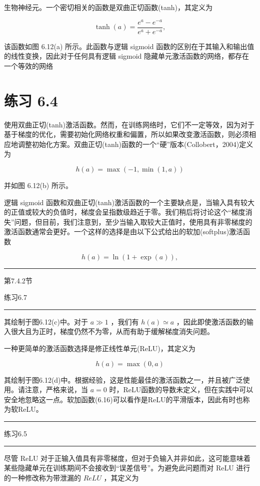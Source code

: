 \documentclass[10pt]{article}
\newcommand{\HRule}{\begin{center}\rule{0.9\linewidth}{0.2mm}\end{center}}
\begin{document}
生物神经元。一个密切相关的函数是双曲正切函数(tanh)，其定义为

\[
\tanh \left( a\right)  = \frac{{e}^{a} - {e}^{-a}}{{e}^{a} + {e}^{-a}}, \tag{6.14}
\]

该函数如图 6.12(a) 所示。此函数与逻辑 sigmoid 函数的区别在于其输入和输出值的线性变换，因此对于任何具有逻辑 sigmoid 隐藏单元激活函数的网络，都存在一个等效的网络

\section*{练习 6.4}

使用双曲正切(tanh)激活函数。然而，在训练网络时，它们不一定等效，因为对于基于梯度的优化，需要初始化网络权重和偏置，所以如果改变激活函数，则必须相应地调整初始化方案。双曲正切(tanh)函数的一个“硬”版本(Collobert，2004)定义为

\[
h\left( a\right)  = \max \left( {-1,\min \left( {1,a}\right) }\right)  \tag{6.15}
\]

并如图 6.12(b) 所示。

逻辑 sigmoid 函数和双曲正切(tanh)激活函数的一个主要缺点是，当输入具有较大的正值或较大的负值时，梯度会呈指数级趋近于零。我们稍后将讨论这个“梯度消失”问题，但目前，我们注意到，至少当输入取较大正值时，使用具有非零梯度的激活函数通常会更好。一个这样的选择是由以下公式给出的软加(softplus)激活函数

\[
h\left( a\right)  = \ln \left( {1 + \exp \left( a\right) }\right) , \tag{6.16}
\]

\HRule

第7.4.2节

练习6.7

\HRule

其绘制于图6.12(c)中。对于 \(a \gg  1\) ，我们有 \(h\left( a\right)  \simeq  a\) ，因此即使激活函数的输入很大且为正时，梯度仍然不为零，从而有助于缓解梯度消失问题。

一种更简单的激活函数选择是修正线性单元(ReLU)，其定义为

\[
h\left( a\right)  = \max \left( {0,a}\right)  \tag{6.17}
\]

其绘制于图6.12(d)中。根据经验，这是性能最佳的激活函数之一，并且被广泛使用。请注意，严格来说，当 \(a = 0\) 时，ReLU函数的导数未定义，但在实践中可以安全地忽略这一点。软加函数(6.16)可以看作是ReLU的平滑版本，因此有时也称为软ReLU。

\HRule

练习6.5

\HRule

尽管 ReLU 对于正输入值具有非零梯度，但对于负输入并非如此，这可能意味着某些隐藏单元在训练期间不会接收到“误差信号”。为避免此问题而对 ReLU 进行的一种修改称为带泄漏的 \({ReLU}\) ，其定义为
\end{document}
